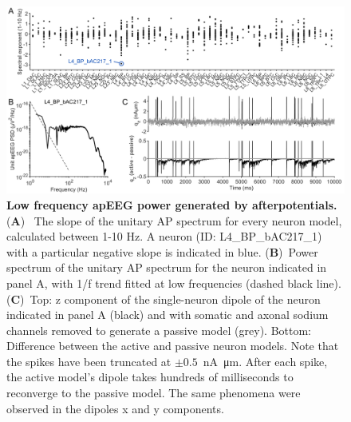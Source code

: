 \begin{figure}[h!]
    \centering
    \includegraphics[width=17cm]{Figures/chapter3/figureS3.png}
    \caption{\textbf{Low frequency apEEG power generated by afterpotentials.} (\textbf{A})~ The slope of the unitary AP spectrum for every neuron model, calculated between 1-10 Hz. A neuron (ID: L4\_BP\_bAC217\_1) with a particular negative slope is indicated in blue. (\textbf{B})~Power spectrum of the unitary AP spectrum for the neuron indicated in panel A, with 1/f trend fitted at low frequencies (dashed black line). (\textbf{C})~Top: z component of the single-neuron dipole of the neuron indicated in panel A (black) and with somatic and axonal sodium channels removed to generate a passive model (grey). Bottom: Difference between the active and passive neuron models. Note that the spikes have been truncated at $\pm 0.5$~\unit{\nano\ampere\micro\meter}. After each spike, the active model's dipole takes hundreds of milliseconds to reconverge to the passive model. The same phenomena were observed in the dipoles x and y components. } 
    \label{fig:low_frequency_apEEG}
\end{figure}

